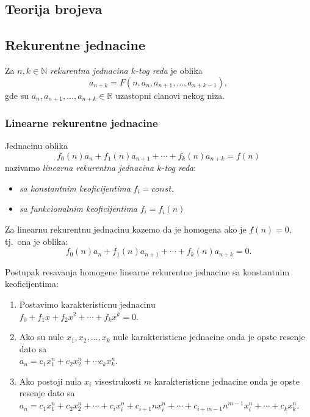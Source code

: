 \documentclass[12p, a4paper]{article}
\begin{document}
\begin{multicols}{2}
    \section{Teorija brojeva}

    \subsection{Rekurentne jednacine}

    Za $n, k \in \mathbb{N}$ \emph{rekurentna jednacina $k$-tog reda} je oblika
    \[
        a_{n+k} = F (n, a_n, a_{n + 1}, \ldots, a_{n + k - 1}),
    \]
    gde su $a_n, a_{n + 1}, \ldots, a_{n + k} \in \mathbb{R}$ uzastopni 
    clanovi nekog niza.

    \subsubsection{Linearne rekurentne jednacine}

    Jednacinu oblika
    \[
        f_0(n) a_n + f_1(n) a_{n + 1} + \cdots + f_k(n) a_{n + k} = f(n)
    \]
    nazivamo \emph{linearna rekurentna jednacina $k$-tog reda}:
    \begin{itemize}
        \item \emph{sa konstantnim keoficijentima} $f_i = const$.
        \item \emph{sa funkcionalnim keoficijentima} $f_i = f_i(n)$
    \end{itemize}

    Za linearnu rekurentnu jednacinu kazemo da je homogena ako je $f(n) = 0$, 
    tj.\ ona je oblika:
    \[
        f_0(n) a_n + f_1(n) a_{n + 1} + \cdots + f_k(n) a_{n + k} = 0.
    \]

    Postupak resavanja homogene linearne rekurentne jednacine sa konstantnim
    keoficijentima:

    \begin{enumerate}
        \itemsep0em
        \item Postavimo karakteristicnu jednacinu \\
            $f_0 + f_1 x + f_2 x^2 +\cdots + f_k x^k = 0$.
        \item Ako su nule $x_1, x_2, \ldots, x_k$ nule karakteristicne 
            jednacine onda je opste resenje dato sa \\
            $a_n = c_1 x_1^n + c_2 x_2^n + \cdots c_k x_k^n$.
        \item Ako postoji nula $x_i$ visestrukosti $m$ karakteristicne
            jednacine onda je opste resenje dato sa \\
            $a_n = c_1 x_1^n + c_2 x_2^n + \cdots + 
            c_i x_i^n + c_{i + 1} n x_i^n + \cdots + 
            c_{i + m - 1} n^{m - 1} x_i^n + \cdots + c_k x_k^n$.
    \end{enumerate}
    

\end{multicols}
\end{document}
